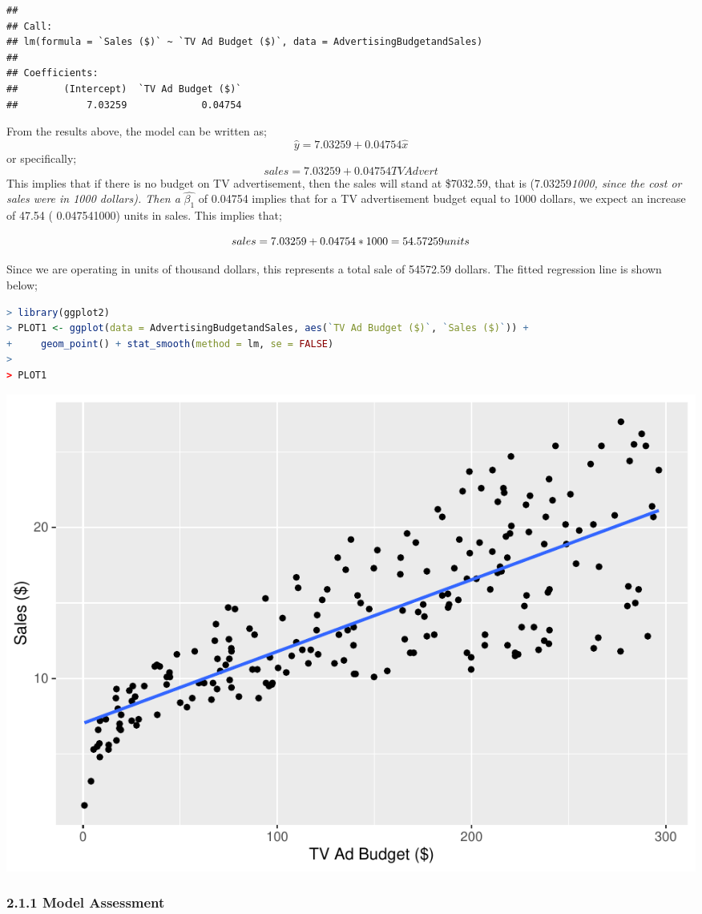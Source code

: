 \documentclass[
]{article}
\begin{document}
\begin{lstlisting}
## 
## Call:
## lm(formula = `Sales ($)` ~ `TV Ad Budget ($)`, data = AdvertisingBudgetandSales)
## 
## Coefficients:
##        (Intercept)  `TV Ad Budget ($)`  
##            7.03259             0.04754
\end{lstlisting}

From the results above, the model can be written as;
\[\hat{y}=7.03259+0.04754\hat{x}\] or specifically;
\[sales=7.03259+0.04754TVAdvert\] This implies that if there is no
budget on TV advertisement, then the sales will stand at \$7032.59, that
is (7.03259\emph{1000, since the cost or sales were in 1000 dollars).
Then a} \(\hat{\beta_1}\) of 0.04754 implies that for a TV advertisement
budget equal to 1000 dollars, we expect an increase of 47.54 (
0.047541000) units in sales. This implies that;

\[sales=7.03259 +0.04754*1000 =54.57259\space units\]

Since we are operating in units of thousand dollars, this represents a
total sale of 54572.59 dollars. The fitted regression line is shown
below;

\begin{lstlisting}[language=R]
> library(ggplot2)
> PLOT1 <- ggplot(data = AdvertisingBudgetandSales, aes(`TV Ad Budget ($)`, `Sales ($)`)) +
+     geom_point() + stat_smooth(method = lm, se = FALSE)
> 
> PLOT1
\end{lstlisting}

\includegraphics{Types-of-Regressions_files/figure-latex/unnamed-chunk-3-1.pdf}

\hypertarget{model-assessment}{%
\subsubsection{\texorpdfstring{2.1.1 Model
Assessment}{2.1.1 Model Assessment }}\label{model-assessment}}
\end{document}
